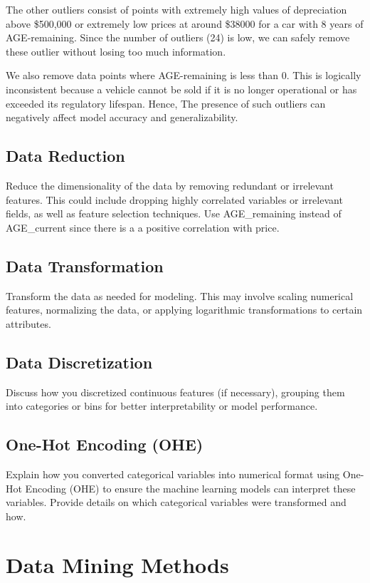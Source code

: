 \documentclass[conference]{IEEEtran}
\begin{document}
The other outliers consist of points with extremely high values of depreciation above \$500,000 or extremely low prices at around \$38000 for a car with 8 years of AGE-remaining. 
Since the number of outliers (24) is low, we can safely remove these outlier without losing too much information.

We also remove data points where AGE-remaining is less than 0. This is logically inconsistent because a vehicle cannot be sold if it is no longer operational or has exceeded its regulatory lifespan. 
Hence, The presence of such outliers can negatively affect model accuracy and generalizability.


\subsection{Data Reduction}
Reduce the dimensionality of the data by removing redundant or irrelevant features. This could include dropping highly correlated variables or irrelevant fields, as well as feature selection techniques.
Use AGE\_remaining instead of AGE\_current since there is a a positive correlation with price.
\subsection{Data Transformation}
Transform the data as needed for modeling. This may involve scaling numerical features, normalizing the data, or applying logarithmic transformations to certain attributes.

\subsection{Data Discretization}
Discuss how you discretized continuous features (if necessary), grouping them into categories or bins for better interpretability or model performance.

\subsection{One-Hot Encoding (OHE)}
Explain how you converted categorical variables into numerical format using One-Hot Encoding (OHE) to ensure the machine learning models can interpret these variables. Provide details on which categorical variables were transformed and how.

\section{Data Mining Methods}
\label{sec:data_mining_methods}
\end{document}
